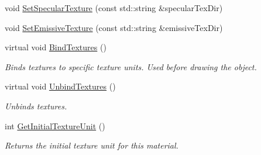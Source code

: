 \begin{DoxyCompactItemize}
\item 
void \mbox{\hyperlink{class_geometry_engine_1_1_geometry_material_1_1_alpha_multi_texture_material_a31ee89561f985b0323397cffc4486262}{Set\+Specular\+Texture}} (const std\+::string \&specular\+Tex\+Dir)
\item 
void \mbox{\hyperlink{class_geometry_engine_1_1_geometry_material_1_1_alpha_multi_texture_material_a036d9058b272dfd5ebb8da8c8b332b46}{Set\+Emissive\+Texture}} (const std\+::string \&emissive\+Tex\+Dir)
\item 
\mbox{\label{class_geometry_engine_1_1_geometry_material_1_1_alpha_multi_texture_material_ae146a684fbdf40efd022973e398c429a}} 
virtual void \mbox{\hyperlink{class_geometry_engine_1_1_geometry_material_1_1_alpha_multi_texture_material_ae146a684fbdf40efd022973e398c429a}{Bind\+Textures}} ()
\begin{DoxyCompactList}\small\item\em Binds textures to specific texture units. Used before drawing the object. \end{DoxyCompactList}\item 
\mbox{\label{class_geometry_engine_1_1_geometry_material_1_1_alpha_multi_texture_material_a712e017a01c22bc330cbd9945257a7a8}} 
virtual void \mbox{\hyperlink{class_geometry_engine_1_1_geometry_material_1_1_alpha_multi_texture_material_a712e017a01c22bc330cbd9945257a7a8}{Unbind\+Textures}} ()
\begin{DoxyCompactList}\small\item\em Unbinds textures. \end{DoxyCompactList}\item 
\mbox{\label{class_geometry_engine_1_1_geometry_material_1_1_alpha_multi_texture_material_acb002f9d22a63e29955556988275b2c9}} 
int \mbox{\hyperlink{class_geometry_engine_1_1_geometry_material_1_1_alpha_multi_texture_material_acb002f9d22a63e29955556988275b2c9}{Get\+Initial\+Texture\+Unit}} ()
\begin{DoxyCompactList}\small\item\em Returns the initial texture unit for this material. \end{DoxyCompactList}\end{DoxyCompactItemize}
